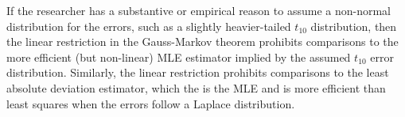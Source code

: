 \documentclass[12pt]{article}
\begin{document}
%
%
%
%
If the researcher has a substantive or empirical reason to assume a non-normal distribution for the errors, such as a slightly heavier-tailed $t_{10}$ distribution, then the linear restriction in the Gauss-Markov theorem prohibits comparisons to the more efficient (but non-linear) MLE estimator implied by the assumed $t_{10}$ error distribution. 
Similarly, the linear restriction prohibits comparisons to the least absolute deviation estimator, which the is the MLE and is more efficient than least squares when the errors follow a Laplace distribution. 
\end{document}
